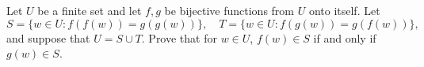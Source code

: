 Let $U$ be a finite set and let $f, g$ be bijective functions from $U$ onto itself. Let
\[ S = \{w \in U : f(f(w)) = g(g(w))\}, \quad T = \{w \in U : f(g(w)) = g(f(w))\}, \]
and suppose that $U = S \cup T$. Prove that for $w \in U$, $f(w) \in S$ if and only if $g(w) \in S$.
